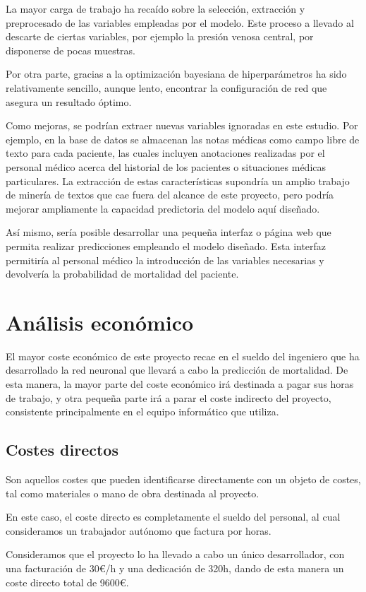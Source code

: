 \documentclass{report}
\begin{document}
La mayor carga de trabajo ha recaído sobre la selección, extracción y
preprocesado de las variables empleadas por el modelo. Este proceso a
llevado al descarte de ciertas variables, por ejemplo la presión venosa
central, por disponerse de pocas muestras.

Por otra parte, gracias a la optimización bayesiana de hiperparámetros
ha sido relativamente sencillo, aunque lento, encontrar la configuración
de red que asegura un resultado óptimo.

Como mejoras, se podrían extraer nuevas variables ignoradas en este
estudio. Por ejemplo, en la base de datos se almacenan las notas médicas
como campo libre de texto para cada paciente, las cuales incluyen
anotaciones realizadas por el personal médico acerca del historial de
los pacientes o situaciones médicas particulares. La extracción de estas
características supondría un amplio trabajo de minería de textos que cae
fuera del alcance de este proyecto, pero podría mejorar ampliamente la capacidad predictoria del modelo aquí diseñado.

Así mismo, sería posible desarrollar una pequeña interfaz o página web
que permita realizar predicciones empleando el modelo diseñado. Esta
interfaz permitiría al personal médico la introducción de las variables
necesarias y devolvería la probabilidad de mortalidad del paciente.

\chapter{Análisis económico}
El mayor coste económico de este proyecto recae en el sueldo del
ingeniero que ha desarrollado la red neuronal que llevará a cabo la
predicción de mortalidad. De esta manera, la mayor parte del coste
económico irá destinada a pagar sus horas de trabajo, y otra pequeña
parte irá a parar el coste indirecto del proyecto, consistente
principalmente en el equipo informático que utiliza.

\section{Costes directos}
Son aquellos costes que pueden identificarse directamente con un objeto
de costes, tal como materiales o mano de obra destinada al proyecto.

En este caso, el coste directo es completamente el sueldo del personal,
al cual consideramos un trabajador autónomo que factura por horas.

Consideramos que el proyecto lo ha llevado a cabo un único desarrollador, con una facturación de 30\euro/h y una dedicación de 320h,
dando de esta manera un coste directo total de 9600\euro.
\end{document}

